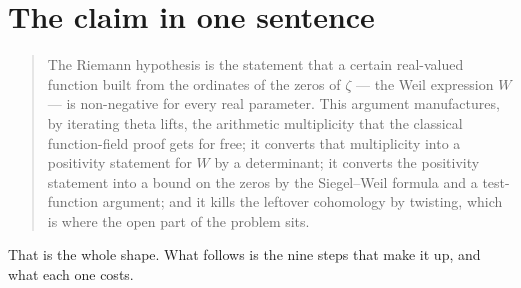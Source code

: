 \section{The claim in one sentence}\begin{quote}
The Riemann hypothesis is the statement that a certain real-valued function
built from the ordinates of the zeros of $\zeta$ --- the Weil expression $W$ ---
is non-negative for every real parameter. This argument manufactures, by
iterating theta lifts, the arithmetic multiplicity that the classical
function-field proof gets for free; it converts that multiplicity into a
positivity statement for $W$ by a determinant; it converts the positivity
statement into a bound on the zeros by the Siegel--Weil formula and a
test-function argument; and it kills the leftover cohomology by twisting,
which is where the open part of the problem sits.
\end{quote}

That is the whole shape. What follows is the nine steps that make it up, and
what each one costs.

